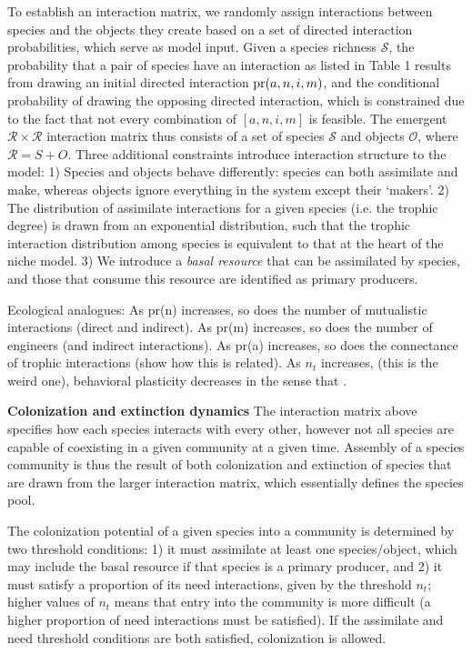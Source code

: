 \documentclass[twocolumn,preprintnumbers,amsmath,amssymb,superscriptaddress]{revtex4}
\begin{document}
To establish an interaction matrix, we randomly assign interactions between species and the objects they create based on a set of directed interaction probabilities, which serve as model input. 
Given a species richness $\mathcal S$, the probability that a pair of species have an interaction as listed in Table 1 results from drawing an initial directed interaction ${\rm pr}(a,n,i,m)$, and the conditional probability of drawing the opposing directed interaction, which is constrained due to the fact that not every combination of $[a,n,i,m]$ is feasible.
The emergent $\mathcal R \times \mathcal R$ interaction matrix thus consists of a set of species $\mathcal S$ and objects $\mathcal O$, where $\mathcal R = S + O$. 
Three additional constraints introduce interaction structure to the model:
1) Species and objects behave differently: species can both assimilate and make, whereas objects ignore everything in the system except their `makers'.
2) The distribution of assimilate interactions for a given species (i.e. the trophic degree) is drawn from an exponential distribution, such that the trophic interaction distribution among species is equivalent to that at the heart of the niche model.
3) We introduce a \emph{basal resource} that can be assimilated by species, and those that consume this resource are identified as primary producers.


Ecological analogues: 
As pr(n) increases, so does the number of mutualistic interactions (direct and indirect).
As pr(m) increases, so does the number of engineers (and indirect interactions).
As pr(a) increases, so does the connectance of trophic interactions (show how this is related).
As $n_t$ increases, (this is the weird one), behavioral plasticity decreases in the sense that .


{\bf Colonization and extinction dynamics}
The interaction matrix above specifies how each species interacts with every other, however not all species are capable of coexisting in a given community at a given time.
Assembly of a species community is thus the result of both colonization and extinction of species that are drawn from the larger interaction matrix, which essentially defines the species pool.

The colonization potential of a given species into a community is determined by two threshold conditions:
1) it must assimilate at least one species/object, which may include the basal resource if that species is a primary producer, and
2) it must satisfy a proportion of its need interactions, given by the threshold $n_t$; higher values of $n_t$ means that entry into the community is more difficult (a higher proportion of need interactions must be satisfied).
If the assimilate and need threshold conditions are both satisfied, colonization is allowed.
\end{document}
